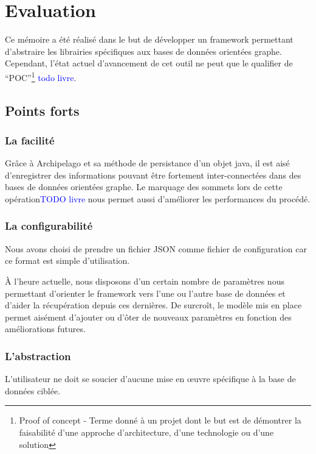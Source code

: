 \documentclass[a4paper,fleqn,12pt]{report}
\begin{document}
\chapter{Evaluation}

Ce mémoire a été réalisé dans le but de développer un framework permettant d'abstraire les librairies spécifiques aux bases de données orientées graphe. Cependant, l'état actuel d'avancement de cet outil ne peut que le qualifier de \enquote{POC}\footnote{Proof of concept - Terme donné à un projet dont le but est de démontrer la faisabilité d'une approche d'architecture, d'une technologie ou d'une solution } \textcolor{blue}{todo livre}.


\section{Points forts}

\subsection{La facilité}

Grâce à Archipelago et sa méthode de persistance d'un objet java, il est aisé d'enregistrer des informations pouvant être fortement inter-connectées dans des bases de données orientées graphe. 
Le marquage des sommets lors de cette opération\textcolor{blue}{TODO livre} nous permet aussi d'améliorer les performances du procédé. 

\subsection{La configurabilité}

Nous avons choisi de prendre un fichier JSON comme fichier de configuration car ce format est simple d'utilisation. 

\`A l'heure actuelle, nous disposons d'un certain nombre de paramètres nous permettant d'orienter le framework vers l'une ou l'autre base de données et d'aider la récupération depuis ces dernières. De surcroît, le modèle mis en place permet aisément d'ajouter ou d'ôter de nouveaux paramètres en fonction des améliorations futures. 

\subsection{L'abstraction}

L'utilisateur ne doit se soucier d'aucune mise en œuvre spécifique à la base de données ciblée. 
\end{document}

